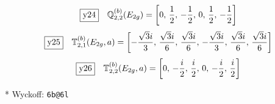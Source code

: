\documentclass[fleqn,10pt,landscape]{jsarticle}
\begin{document}
\begin{dmath*}
\fbox{y24}\quad \mathbb{Q}_{2,2}^{(b)}(E_{2g})=\left[ 0,\, \frac{1}{2},\, - \frac{1}{2},\, 0,\, \frac{1}{2},\, - \frac{1}{2} \right]
\end{dmath*}
\begin{dmath*}
\fbox{y25}\quad \mathbb{T}_{2,1}^{(b)}(E_{2g},a)=\left[ - \frac{\sqrt{3} i}{3},\, \frac{\sqrt{3} i}{6},\, \frac{\sqrt{3} i}{6},\, - \frac{\sqrt{3} i}{3},\, \frac{\sqrt{3} i}{6},\, \frac{\sqrt{3} i}{6} \right]
\end{dmath*}
\begin{dmath*}
\fbox{y26}\quad \mathbb{T}_{2,2}^{(b)}(E_{2g},a)=\left[ 0,\, - \frac{i}{2},\, \frac{i}{2},\, 0,\, - \frac{i}{2},\, \frac{i}{2} \right]
\end{dmath*}
\vspace{5mm}

\noindent ** Wyckoff: \texttt{6b@6l}
\end{document}
